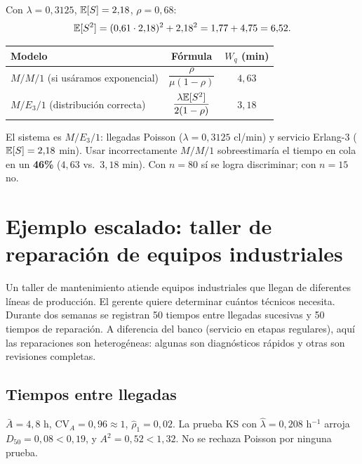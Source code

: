 \documentclass[11pt, letterpaper]{article}
\begin{document}
Con $\lambda = 0{,}3125$, $\mathbb{E}[S] = 2{,}18$, $\rho = 0{,}68$:
\[
\mathbb{E}[S^2] = (0{,}61 \cdot 2{,}18)^2 + 2{,}18^2 = 1{,}77 + 4{,}75 = 6{,}52.
\]

\begin{center}\small
\renewcommand{\arraystretch}{1.3}
\begin{tabular}{lcc}
\toprule
\textbf{Modelo} & \textbf{Fórmula} & $W_q$ (min) \\
\midrule
$M/M/1$ (si usáramos exponencial) & $\dfrac{\rho}{\mu(1-\rho)}$ & $4{,}63$ \\[10pt]
$M/E_3/1$ (distribución correcta)  & $\dfrac{\lambda\mathbb{E}[S^2]}{2(1-\rho)}$ & $3{,}18$ \\
\bottomrule
\end{tabular}
\end{center}

\begin{resultadobox}
El sistema es $M/E_3/1$: llegadas Poisson ($\lambda=0{,}3125$ cl/min) y servicio Erlang-3 ($\mathbb{E}[S]=2{,}18$ min). Usar incorrectamente $M/M/1$ sobreestimaría el tiempo en cola en un \textbf{46\%} ($4{,}63$ vs.\ $3{,}18$ min). Con $n=80$ sí se logra discriminar; con $n=15$ no.
\end{resultadobox}

\section{Ejemplo escalado: taller de reparación de equipos industriales}

\begin{ejemplobox}[Sistema]
Un taller de mantenimiento atiende equipos industriales que llegan de diferentes líneas de producción. El gerente quiere determinar cuántos técnicos necesita. Durante dos semanas se registran 50 tiempos entre llegadas sucesivas y 50 tiempos de reparación. A diferencia del banco (servicio en etapas regulares), aquí las reparaciones son heterogéneas: algunas son diagnósticos rápidos y otras son revisiones completas.
\end{ejemplobox}

\subsection{Tiempos entre llegadas}

$\bar{A}=4{,}8$ h, $\text{CV}_A = 0{,}96 \approx 1$, $\hat\rho_1 = 0{,}02$. La prueba KS con $\hat\lambda=0{,}208$ h$^{-1}$ arroja $D_{50}=0{,}08 < 0{,}19$, y $A^2 = 0{,}52 < 1{,}32$. No se rechaza Poisson por ninguna prueba.
\end{document}
